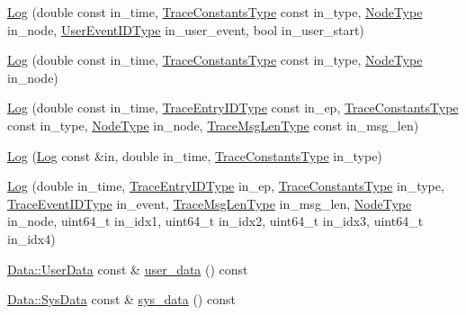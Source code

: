 \begin{DoxyCompactItemize}
\item 
\hyperlink{structvt_1_1trace_1_1_log_a79db16327d513ab1b4ecd114a5661e71}{Log} (double const in\+\_\+time, \hyperlink{namespacevt_1_1trace_acf454dfbd581b0ebae895f90b5927a1d}{Trace\+Constants\+Type} const in\+\_\+type, \hyperlink{namespacevt_a866da9d0efc19c0a1ce79e9e492f47e2}{Node\+Type} in\+\_\+node, \hyperlink{namespacevt_1_1trace_a5908920d051c144c89f17c69ed262350}{User\+Event\+I\+D\+Type} in\+\_\+user\+\_\+event, bool in\+\_\+user\+\_\+start)
\item 
\hyperlink{structvt_1_1trace_1_1_log_acdd2da55901a3de70e02d68f78b6d3b6}{Log} (double const in\+\_\+time, \hyperlink{namespacevt_1_1trace_acf454dfbd581b0ebae895f90b5927a1d}{Trace\+Constants\+Type} const in\+\_\+type, \hyperlink{namespacevt_a866da9d0efc19c0a1ce79e9e492f47e2}{Node\+Type} in\+\_\+node)
\item 
\hyperlink{structvt_1_1trace_1_1_log_a6a70a5ee694d066e4cd7332e4c11ad52}{Log} (double const in\+\_\+time, \hyperlink{namespacevt_1_1trace_a3c14050715ba9eceaeff51fb3de64f2f}{Trace\+Entry\+I\+D\+Type} const in\+\_\+ep, \hyperlink{namespacevt_1_1trace_acf454dfbd581b0ebae895f90b5927a1d}{Trace\+Constants\+Type} const in\+\_\+type, \hyperlink{namespacevt_a866da9d0efc19c0a1ce79e9e492f47e2}{Node\+Type} in\+\_\+node, \hyperlink{namespacevt_1_1trace_aeb598f45d67d41db7902e494f2f0ce59}{Trace\+Msg\+Len\+Type} const in\+\_\+msg\+\_\+len)
\item 
\hyperlink{structvt_1_1trace_1_1_log_a3824153f3da56014a1473b518eee5654}{Log} (\hyperlink{structvt_1_1trace_1_1_log}{Log} const \&in, double in\+\_\+time, \hyperlink{namespacevt_1_1trace_acf454dfbd581b0ebae895f90b5927a1d}{Trace\+Constants\+Type} in\+\_\+type)
\item 
\hyperlink{structvt_1_1trace_1_1_log_ab48521fa03009ac8033116f7f06b195b}{Log} (double in\+\_\+time, \hyperlink{namespacevt_1_1trace_a3c14050715ba9eceaeff51fb3de64f2f}{Trace\+Entry\+I\+D\+Type} in\+\_\+ep, \hyperlink{namespacevt_1_1trace_acf454dfbd581b0ebae895f90b5927a1d}{Trace\+Constants\+Type} in\+\_\+type, \hyperlink{namespacevt_1_1trace_a64a7185f3e102df8d8258f263ccd1582}{Trace\+Event\+I\+D\+Type} in\+\_\+event, \hyperlink{namespacevt_1_1trace_aeb598f45d67d41db7902e494f2f0ce59}{Trace\+Msg\+Len\+Type} in\+\_\+msg\+\_\+len, \hyperlink{namespacevt_a866da9d0efc19c0a1ce79e9e492f47e2}{Node\+Type} in\+\_\+node, uint64\+\_\+t in\+\_\+idx1, uint64\+\_\+t in\+\_\+idx2, uint64\+\_\+t in\+\_\+idx3, uint64\+\_\+t in\+\_\+idx4)
\item 
\hyperlink{structvt_1_1trace_1_1_log_1_1_data_1_1_user_data}{Data\+::\+User\+Data} const  \& \hyperlink{structvt_1_1trace_1_1_log_a7b251bc7dcebcbbafa29cc2ca6ea4c12}{user\+\_\+data} () const
\item 
\hyperlink{structvt_1_1trace_1_1_log_1_1_data_1_1_sys_data}{Data\+::\+Sys\+Data} const  \& \hyperlink{structvt_1_1trace_1_1_log_a082937c397ac5b47ffc9089ff94698f0}{sys\+\_\+data} () const
\end{DoxyCompactItemize}
